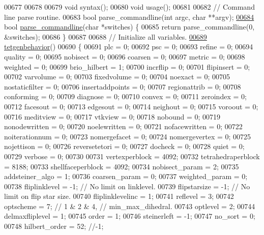 \begin{DoxyCode}
00677 
00678 
00679   \textcolor{keywordtype}{void} syntax();
00680   \textcolor{keywordtype}{void} usage();
00681 
00682   \textcolor{comment}{// Command line parse routine.}
00683   \textcolor{keywordtype}{bool} parse\_commandline(\textcolor{keywordtype}{int} argc, \textcolor{keywordtype}{char} **argv);
\hypertarget{tetgen_8h_source.tex_l00684}{}\hyperlink{classtetgenbehavior_abf5ad80b5b6900296253c6126f667fe2}{00684}   \textcolor{keywordtype}{bool} \hyperlink{classtetgenbehavior_abf5ad80b5b6900296253c6126f667fe2}{parse\_commandline}(\textcolor{keywordtype}{char} *switches) \{
00685     \textcolor{keywordflow}{return} parse\_commandline(0, &switches);
00686   \}
00687 
00688   \textcolor{comment}{// Initialize all variables.}
\hypertarget{tetgen_8h_source.tex_l00689}{}\hyperlink{classtetgenbehavior_aa9c947b94b6b238e3aeedd7eb029667e}{00689}   \hyperlink{classtetgenbehavior_aa9c947b94b6b238e3aeedd7eb029667e}{tetgenbehavior}()
00690   \{
00691     plc = 0;
00692     psc = 0;
00693     refine = 0;
00694     quality = 0;
00695     nobisect = 0;
00696     coarsen = 0;
00697     metric = 0;
00698     weighted = 0;
00699     brio\_hilbert = 1;
00700     incrflip = 0;
00701     flipinsert = 0;
00702     varvolume = 0;
00703     fixedvolume = 0;
00704     noexact = 0;
00705     nostaticfilter = 0;
00706     insertaddpoints = 0;
00707     regionattrib = 0;
00708     conforming = 0;
00709     diagnose = 0;
00710     convex = 0;
00711     zeroindex = 0;
00712     facesout = 0;
00713     edgesout = 0;
00714     neighout = 0;
00715     voroout = 0;
00716     meditview = 0;
00717     vtkview = 0;
00718     nobound = 0;
00719     nonodewritten = 0;
00720     noelewritten = 0;
00721     nofacewritten = 0;
00722     noiterationnum = 0;
00723     nomergefacet = 0;
00724     nomergevertex = 0;
00725     nojettison = 0;
00726     reversetetori = 0;
00727     docheck = 0;
00728     quiet = 0;
00729     verbose = 0;
00730 
00731     vertexperblock = 4092;
00732     tetrahedraperblock = 8188;
00733     shellfaceperblock = 4092;
00734     nobisect\_param = 2;
00735     addsteiner\_algo = 1;
00736     coarsen\_param = 0;
00737     weighted\_param = 0;
00738     fliplinklevel = -1; \textcolor{comment}{// No limit on linklevel.}
00739     flipstarsize = -1;  \textcolor{comment}{// No limit on flip star size.}
00740     fliplinklevelinc = 1;
00741     reflevel = 3;
00742     optscheme = 7;  \textcolor{comment}{// 1 & 2 & 4, // min\_max\_dihedral.}
00743     optlevel = 2;
00744     delmaxfliplevel = 1;
00745     order = 1;
00746     steinerleft = -1;
00747     no\_sort = 0;
00748     hilbert\_order = 52; \textcolor{comment}{//-1;}

\end{DoxyCode}
